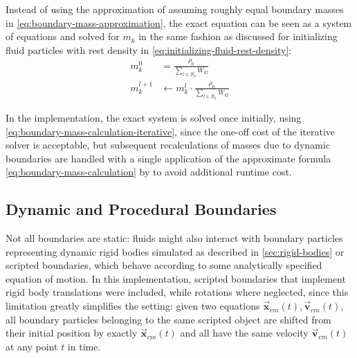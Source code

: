 \documentclass[oneside, a4paper]{book}
\newcommand\vek[1]{\vec{\bm{#1}}}
\begin{document}
    Instead of using the approximation of assuming roughly equal boundary masses in \autoref{eq:boundary-mass-approximation}, the exact equation can be seen as a system of equations and solved for $m_k$ in the same fashion as discussed for initializing fluid particles with rest density in \autoref{eq:initializing-fluid-rest-density}:
    \begin{align}
      m_k^0 &= \frac{\rho_0}{\sum_{l\in\mathcal{B}_k} W_{kl}}\\
      m_k^{l+1} &\gets m_k^l \cdot \frac{\rho_0}{\sum_{l\in\mathcal{B}_k} W_{kl}}\label{eq:boundary-mass-calculation-iterative}
    \end{align}

    In the implementation, the exact system is solved once initially, using \autoref{eq:boundary-mass-calculation-iterative}, since the one-off cost of the iterative solver is acceptable, but subsequent recalculations of masses due to dynamic boundaries are handled with a single application of the approximate formula \autoref{eq:boundary-mass-calculation} by \autocite[Akinci et al.]{versatile-boundary-akinci} to avoid additional runtime cost.
    
    \subsection{Dynamic and Procedural Boundaries}
    Not all boundaries are static: fluids might also interact with boundary particles representing dynamic rigid bodies simulated as described in \autoref{sec:rigid-bodies} or scripted boundaries, which behave according to some analytically specified equation of motion. In this implementation, scripted boundaries that implement rigid body translations were included, while rotations where neglected, since this limitation greatly simplifies the setting: given two equations $\vek{x}_{cm}(t), \vek{v}_{cm}(t)$, all boundary particles belonging to the same scripted object are shifted from their initial position by exactly $\vek{x}_{cm}(t)$ and all have the same velocity $\vek{v}_{cm}(t)$ at any point $t$ in time. 
\end{document}
